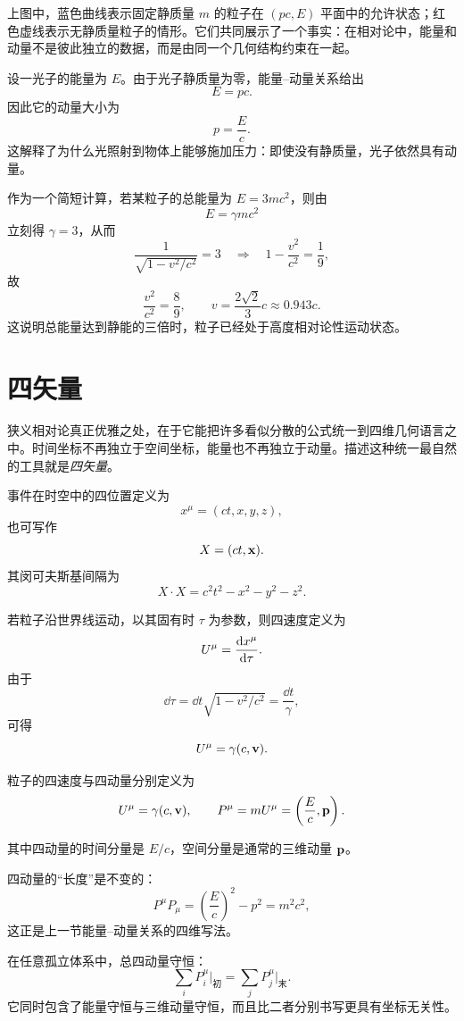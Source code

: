 上图中，蓝色曲线表示固定静质量 $m$ 的粒子在 $(pc,E)$ 平面中的允许状态；红色虚线表示无静质量粒子的情形。它们共同展示了一个事实：在相对论中，能量和动量不是彼此独立的数据，而是由同一个几何结构约束在一起。

\begin{example}[光子的动量]
设一光子的能量为 $E$。由于光子静质量为零，能量--动量关系给出
\[
E=pc.
\]
因此它的动量大小为
\[
p=\frac{E}{c}.
\]
这解释了为什么光照射到物体上能够施加压力：即使没有静质量，光子依然具有动量。
\end{example}

作为一个简短计算，若某粒子的总能量为 $E=3mc^2$，则由
\[
E=\gamma mc^2
\]
立刻得 $\gamma=3$，从而
\[
\frac{1}{\sqrt{1-v^2/c^2}}=3
\quad\Longrightarrow\quad
1-\frac{v^2}{c^2}=\frac19,
\]
故
\[
\frac{v^2}{c^2}=\frac89,
\qquad
v=\frac{2\sqrt{2}}{3}c\approx 0.943c.
\]
这说明总能量达到静能的三倍时，粒子已经处于高度相对论性运动状态。

\section{四矢量}

狭义相对论真正优雅之处，在于它能把许多看似分散的公式统一到四维几何语言之中。时间坐标不再独立于空间坐标，能量也不再独立于动量。描述这种统一最自然的工具就是\emph{四矢量}。

\begin{definition}[四位置]
事件在时空中的四位置定义为
\[
x^\mu=(ct, x, y, z),
\]
也可写作
\[
X=(ct,\vb{x}).
\]
其闵可夫斯基间隔为
\[
X\cdot X = c^2 t^2 - x^2 - y^2 - z^2.
\]
\end{definition}

若粒子沿世界线运动，以其固有时 $\tau$ 为参数，则四速度定义为
\[
U^\mu = \dv{x^\mu}{\tau}.
\]
由于
\[
\dd \tau = \dd t\sqrt{1-v^2/c^2}=\frac{\dd t}{\gamma},
\]
可得
\[
U^\mu = \gamma(c, \vb{v}).
\]

\begin{definition}[四速度与四动量]
粒子的四速度与四动量分别定义为
\[
U^\mu = \gamma(c,\vb{v}),
\qquad
P^\mu = mU^\mu = \left(\frac{E}{c},\vb{p}\right).
\]

其中四动量的时间分量是 $E/c$，空间分量是通常的三维动量 $\vb{p}$。
\end{definition}

四动量的“长度”是不变的：
\[
P^\mu P_\mu = \left(\frac{E}{c}\right)^2-p^2 = m^2c^2,
\]
这正是上一节能量--动量关系的四维写法。

\begin{law}[四动量守恒]
在任意孤立体系中，总四动量守恒：
\[
\sum_i P_i^\mu\bigg|_{\text{初}}=
\sum_j P_j^\mu\bigg|_{\text{末}}.
\]
它同时包含了能量守恒与三维动量守恒，而且比二者分别书写更具有坐标无关性。
\end{law}

